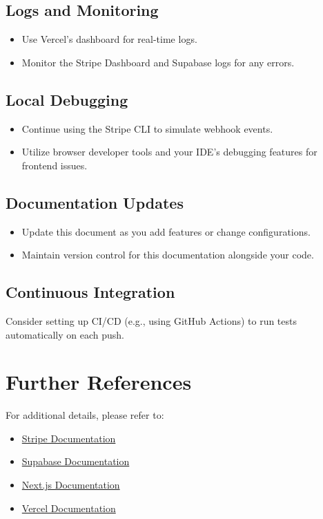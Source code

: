 \documentclass[11pt]{article}
\begin{document}
\subsection{Logs and Monitoring}
\begin{itemize}[leftmargin=*]
    \item Use Vercel’s dashboard for real-time logs.
    \item Monitor the Stripe Dashboard and Supabase logs for any errors.
\end{itemize}

\subsection{Local Debugging}
\begin{itemize}[leftmargin=*]
    \item Continue using the Stripe CLI to simulate webhook events.
    \item Utilize browser developer tools and your IDE’s debugging features for frontend issues.
\end{itemize}

\subsection{Documentation Updates}
\begin{itemize}[leftmargin=*]
    \item Update this document as you add features or change configurations.
    \item Maintain version control for this documentation alongside your code.
\end{itemize}

\subsection{Continuous Integration}
Consider setting up CI/CD (e.g., using GitHub Actions) to run tests automatically on each push.

\section{Further References}
For additional details, please refer to:
\begin{itemize}[leftmargin=*]
    \item \href{https://stripe.com/docs}{Stripe Documentation}
    \item \href{https://supabase.com/docs}{Supabase Documentation}
    \item \href{https://nextjs.org/docs}{Next.js Documentation}
    \item \href{https://vercel.com/docs}{Vercel Documentation}
\end{itemize}
\end{document}
